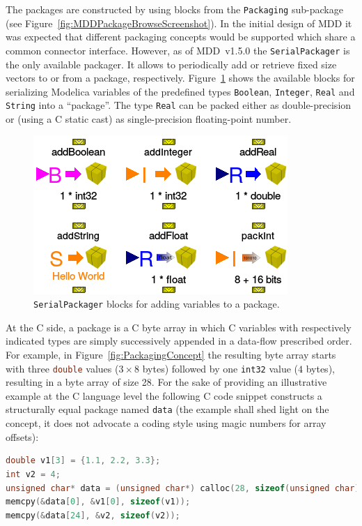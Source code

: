 \documentclass{resources/modelica}
\newcommand{\clang}[1]{\lstinline[language=c]|#1|}
\newcommand{\modelica}[1]{\lstinline[language=modelica]|#1|}
\begin{document}
\noindent
The packages are constructed by using blocks from the \modelica{Packaging}
sub-package (see Figure~\ref{fig:MDDPackageBrowseScreenshot}). In the initial
design of MDD it was expected that different packaging concepts would be
supported which share a common connector interface. However, as of MDD~v1.5.0
the \modelica{SerialPackager} is the only available packager. It allows
to periodically add or retrieve fixed size vectors to or from a package, respectively.
Figure~\ref{fig:SerialPackagerBlocks} shows the available blocks for serializing
Modelica variables of the predefined types \modelica{Boolean}, \modelica{Integer}, \modelica{Real} and \mbox{\modelica{String}} into a ``package''.
The type \modelica{Real} can be packed either as double-precision or (using a C
static cast) as single-precision floating-point number.
\begin{figure}[h]
  \centering
  \includegraphics[width=0.6\columnwidth]{figures/SerialPackagerBlocks}
  \caption{\modelica{SerialPackager} blocks for adding variables to a package.}
  \label{fig:SerialPackagerBlocks}
\end{figure}

\noindent
At the C side, a package is a C byte array in which C variables with
respectively indicated types are simply successively appended in a data-flow
prescribed order. For example, in Figure~\ref{fig:PackagingConcept} the
resulting byte array starts with three \clang{double} values ($3 \times 8$ bytes)
followed by one \clang{int32} value ($4$ bytes), resulting in a byte array of size 28.
For the sake of providing an illustrative example at the C language level
the following C code snippet constructs a structurally equal package named
\clang{data} (the example shall shed light on the concept, it does not
advocate a coding style using magic numbers for array offsets):
\begin{lstlisting}[language=C]
double v1[3] = {1.1, 2.2, 3.3};
int v2 = 4;
unsigned char* data = (unsigned char*) calloc(28, sizeof(unsigned char));
memcpy(&data[0], &v1[0], sizeof(v1));
memcpy(&data[24], &v2, sizeof(v2));
\end{lstlisting}
\end{document}
